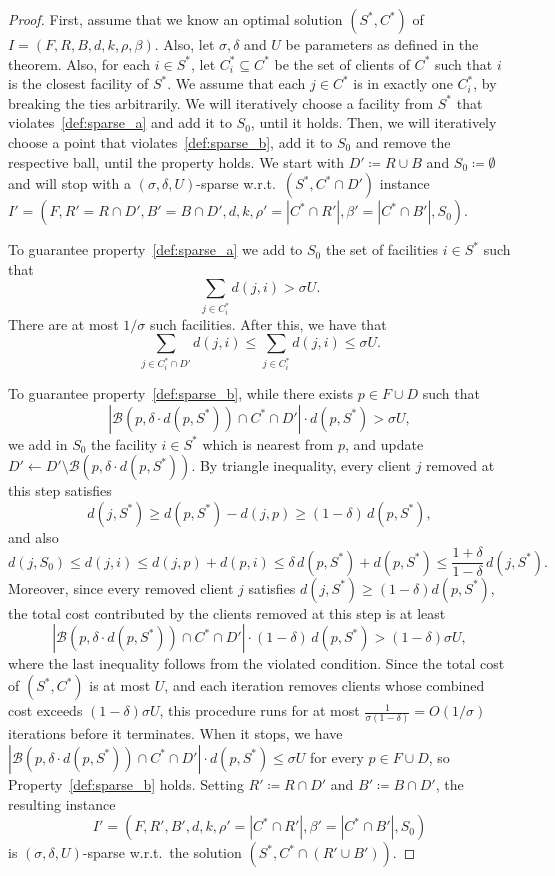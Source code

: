 \documentclass[a4paper,11pt]{article}
\begin{document}
\begin{proof}
First, assume that we know an optimal solution $(S^*,C^*)$ of $I = (F,R,B,d,k,\rho,\beta)$. Also, let $\sigma,\delta$ and $U$
be parameters as defined in the theorem. Also, for each $i \in S^*$, let
$C_i^* \subseteq C^*$ be the set of clients of $C^*$ such that $i$ is
the closest facility of $S^*$. We assume that each $j \in C^*$ is in
exactly one $C_i^*$, by breaking the ties arbitrarily. We will
iteratively choose a facility from $S^*$ that violates~\ref{def:sparse_a}
and add it to $S_0$, until it holds. Then, we will iteratively choose a
point that violates~\ref{def:sparse_b}, add it to $S_0$ and remove the
respective ball, until the property holds. We start with $D' \coloneqq R
\cup B$ and $S_0 \coloneqq \emptyset$ and will stop with a
$(\sigma,\delta,U)$-sparse w.r.t.\ $(S^*,C^* \cap D')$ instance $I' =
(F, R' = R\cap D', B' = B \cap D', d, k, \rho' = |C^* \cap R'|, \beta' =
|C^* \cap B'|, S_0)$.

To guarantee property~\ref{def:sparse_a} we add to $S_0$ the set of
facilities $i \in S^*$ such that 
\[\sum_{j \in C_i^*} d(j, i) > \sigma U.\]
There are at most $1/\sigma$ such facilities. After this, we have
that 
\[\sum_{j \in C_i^* \cap D'} d(j,i) \leq \sum_{j \in C_i^*} d(j, i)
\leq \sigma U.\]

To guarantee property~\ref{def:sparse_b}, while there exists $p \in F
\cup D$ such that
\[
|\mathcal{B}(p, \delta \cdot d(p, S^*)) \cap C^* \cap D'| \cdot d(p,
S^*) > \sigma U,
\]
we add in $S_0$ the facility $i \in S^*$ which is nearest from $p$, and
update ${D' \gets D' \setminus \mathcal{B}(p, \delta \cdot d(p,S^*))}$.
By triangle inequality, every client $j$ removed at this step satisfies
\[d(j,S^*) \ge d(p,S^*) - d(j,p) \ge (1-\delta)\, d(p,S^*),\] and also
\[
d(j,S_0) \le d(j,i) \le d(j,p) + d(p,i) \le \delta\, d(p,S^*) +
d(p,S^*) \le \frac{1+\delta}{1-\delta}\, d(j,S^*).
\]
Moreover, since every removed client $j$ satisfies $d(j,S^*) \ge
(1-\delta)d(p,S^*)$, the total cost contributed by the clients removed
at this step is at least
\[
|\mathcal{B}(p,\delta \cdot d(p,S^*)) \cap C^* \cap D'| \cdot
(1-\delta)\, d(p,S^*) > (1-\delta)\sigma U,
\]
where the last inequality follows from the violated condition. Since
the total cost of $(S^*,C^*)$ is at most $U$, and each iteration
removes clients whose combined cost exceeds $(1-\delta)\sigma U$, this
procedure runs for at most $\frac{1}{\sigma(1-\delta)} = O(1/\sigma)$
iterations before it terminates. When it stops, we have
$|\mathcal{B}(p,\delta\cdot d(p,S^*)) \cap C^* \cap D'|\cdot d(p,S^*)
\le \sigma U$ for every $p\in F\cup D$, so Property~\ref{def:sparse_b}
holds. Setting $R' \coloneqq R \cap D'$ and $B' \coloneqq B \cap D'$,
the resulting instance 
\[I' = (F, R', B', d, k, \rho' = |C^* \cap R'|,
\beta' = |C^* \cap B'|, S_0)\] 
is $(\sigma, \delta, U)$-sparse w.r.t.\
the solution $(S^*,C^*\cap(R'\cup B'))$.


\end{proof}
\end{document}
